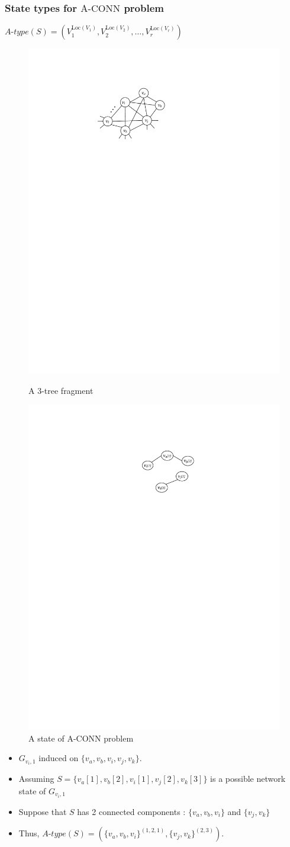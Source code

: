 \documentclass{beamer}
\newcommand{\loc}   	{ {\mathrm {Loc}} }
\newcommand{\ACONN}   { {\mathrm {A\mbox{-}CONN}} }
\begin{document}
\begin{frame}
\frametitle{State types for $\ACONN$ problem}
\vspace{-0.4 cm}
\centerline{
$A\mbox{-}type(S)=(V_1^{\loc(V_1)}, V_2^{\loc(V_2)}, \ldots, V_r^{\loc(V_r)})$}
\vspace{-0.4 cm}
\begin{figure}
\begin{minipage}{0.45\linewidth}
\includegraphics[width=1.6 in, height=0.7 in]{Ch3f2.pdf}
\vspace{-0.4 cm}
 \caption{ A 3-tree fragment}
 \label{fig:f32t1}
\end{minipage}
\begin{minipage}{0.5\linewidth}
\includegraphics[width=1.6 in, height=0.7 in]{State.pdf}
\vspace{-0.4 cm}
 \caption{ A state of $\ACONN$ problem}
 \label{fig:f32t21}
\end{minipage}
\vspace{-0.4 cm}
\end{figure}
\vspace{-0.85em}
\begin{example}
\normalfont
\begin{itemize}
\item $G_{v_i,1}$ induced on  $\{v_a, v_b, v_i, v_j,v_k\}$.
\item Assuming $S=\{v_a[1], v_b[2], v_i[1], v_j[2], v_k[3]\}$ is a possible network state of $G_{v_i,1}$
\item Suppose that $S$ has 2 connected components : $\{v_a, v_b, v_i\}$ and $\{v_j, v_k\}$
\item Thus, $A\mbox{-}type(S)=(\{v_a,v_b,v_i\}^{(1,2,1)}, \{v_j,v_k\}^{(2,3)})$. 
\end{itemize} 
\end{example}
\end{frame}
\end{document}

